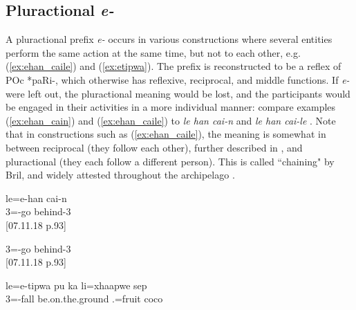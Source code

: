 %
%
%
%

\subsection{Pluractional \textit{e-}}
\label{ssec:pluriactional}
A pluractional prefix \textit{e-} occurs in various constructions where several entities perform the same action at the same time, but not to each other, e.g. (\ref{ex:ehan_caile}) and (\ref{ex:etipwa}). The prefix is reconstructed to be a reflex of POc *paRi-, which otherwise has reflexive, reciprocal, and middle functions. If \textit{e-} were left out, the pluractional meaning would be lost, and the participants would be engaged in their activities in a more individual manner: compare examples (\ref{ex:ehan_cain}) and (\ref{ex:ehan_caile}) to \textit{le han cai-n}  and \textit{le han cai-le} . Note that in constructions such as (\ref{ex:ehan_caile}), the meaning is somewhat in between reciprocal (they follow each other), further described in , and pluractional (they each follow a different person). This is called ``chaining" by Bril, and widely attested throughout the archipelago \parencite[32, 47]{bril_semantic_2005b}.

\ea\label{ex:ehan_cain}\gll le=e-han cai-n\\
 3=-go behind-3\\
\glt {} {[07.11.18 p.93]}
\z


\ea\label{ex:ehan_caile}
 3=-go behind-3\\
\glt {} {[07.11.18 p.93]}
\z


\ea\label{ex:etipwa}\gll le=e-tipwa pu ka li=xhaapwe sep\\
 3=-fall be.on.the.ground  .=fruit coco\\
\glt {}\\
\z
 

